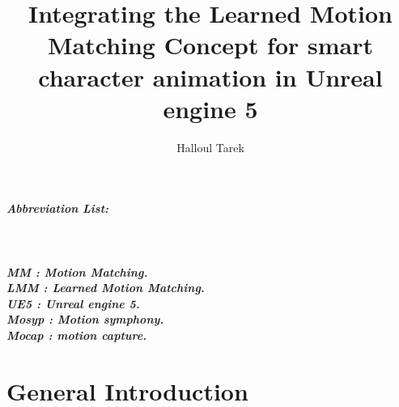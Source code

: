 \documentclass[12pt]{book}
\title{Integrating the Learned Motion  Matching Concept for smart character animation in Unreal engine 5 }
\author{Halloul Tarek}
\begin{document}

\let\cleardoublepage=\clearpage
\dominitoc
\tableofcontents
\listoffigures
\listoftables
\newpage
\paragraph*{\textbf{\huge Abbreviation List:}\\
    \\
    \\
    \\
    MM  : Motion Matching.\\
    LMM : Learned Motion Matching.\cite{LMM}\\
    UE5 : Unreal engine 5.\\
    Mosyp : Motion symphony.\\
    Mocap : motion capture.\\
}
\let\cleardoublepage=\clearpage
{}
\setcounter{page}{0}

\chapter*{General Introduction}
\end{document}
